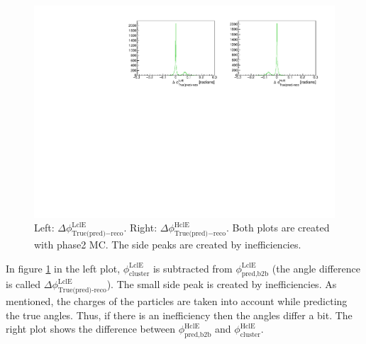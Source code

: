 \documentclass[a4paper,11pt,twosided,final,german,openbib,pdftex,listof=totoc,bibliography=totoc]{scrbook}
\begin{document}
\begin{figure}[!htbp]
	\centering
	\includegraphics[width=\textwidth]{AnhangPlots/b2b_MC.pdf}
	\caption[b2bPhi - Phi For Phase2 MC]{Left: $\Delta \phi _{\textrm{True(pred)} - \textrm{reco}}^{\textrm{LclE}}$. Right:  $\Delta \phi _{\textrm{True(pred)} - \textrm{reco}}^{\textrm{HclE}}$. Both plots are created with phase2 MC. The side peaks are created by inefficiencies.}
	\label{fig:cb2bMC}
\end{figure}


In figure \ref{fig:cb2bMC} in the left plot, $\phi_{\textrm{cluster}}^{\textrm{LclE}}$ is subtracted from $\phi_{\textrm{pred,b2b}}^{\textrm{LclE}}$ (the angle difference is called $\Delta \phi_{\textrm{True(pred)-reco}}^{\textrm{LclE}}$). The small side peak is created by inefficiencies. As mentioned, the charges of the particles are taken into account while predicting the true angles. Thus, if there is an inefficiency then the angles differ a bit. The right plot shows the difference between $\phi_{\textrm{pred,b2b}}^{\textrm{HclE}}$ and $\phi_{\textrm{cluster}}^{\textrm{HclE}}$.
\end{document}
